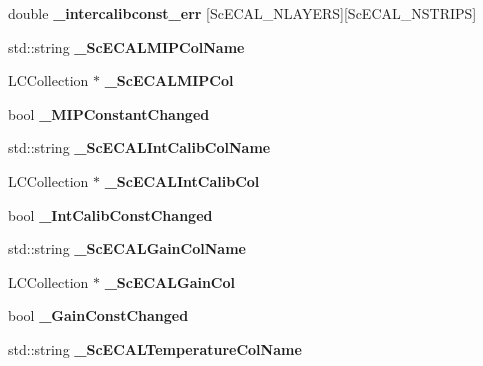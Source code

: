 \begin{DoxyCompactItemize}
\item 
double {\bfseries \-\_\-intercalibconst\-\_\-err} [Sc\-E\-C\-A\-L\-\_\-\-N\-L\-A\-Y\-E\-R\-S][Sc\-E\-C\-A\-L\-\_\-\-N\-S\-T\-R\-I\-P\-S]\label{classCALICE_1_1IntegratedScECALCalibrationProcessor_a447fee3ab3e691f7753e77849a3f5156}

\item 
std\-::string {\bfseries \-\_\-\-Sc\-E\-C\-A\-L\-M\-I\-P\-Col\-Name}\label{classCALICE_1_1IntegratedScECALCalibrationProcessor_a23fa64acf0c4c56a27cd218e45a72a95}

\item 
L\-C\-Collection $\ast$ {\bfseries \-\_\-\-Sc\-E\-C\-A\-L\-M\-I\-P\-Col}\label{classCALICE_1_1IntegratedScECALCalibrationProcessor_af9da8b814eec1d7428a50f752826816b}

\item 
bool {\bfseries \-\_\-\-M\-I\-P\-Constant\-Changed}\label{classCALICE_1_1IntegratedScECALCalibrationProcessor_a7adcc04792d1e9c91be42fffb9650ecb}

\item 
std\-::string {\bfseries \-\_\-\-Sc\-E\-C\-A\-L\-Int\-Calib\-Col\-Name}\label{classCALICE_1_1IntegratedScECALCalibrationProcessor_a06cf578e8d2e90e83423c4cda9212719}

\item 
L\-C\-Collection $\ast$ {\bfseries \-\_\-\-Sc\-E\-C\-A\-L\-Int\-Calib\-Col}\label{classCALICE_1_1IntegratedScECALCalibrationProcessor_a0ff44ca5a38c2b4b95b6f66e532c0f0f}

\item 
bool {\bfseries \-\_\-\-Int\-Calib\-Const\-Changed}\label{classCALICE_1_1IntegratedScECALCalibrationProcessor_a79ad2dea374a18735ecf63568815738e}

\item 
std\-::string {\bfseries \-\_\-\-Sc\-E\-C\-A\-L\-Gain\-Col\-Name}\label{classCALICE_1_1IntegratedScECALCalibrationProcessor_a35226bdbae7c441b3537037d5100d27c}

\item 
L\-C\-Collection $\ast$ {\bfseries \-\_\-\-Sc\-E\-C\-A\-L\-Gain\-Col}\label{classCALICE_1_1IntegratedScECALCalibrationProcessor_aafd6b24dd5fbfcf0abeeb5c887faa07a}

\item 
bool {\bfseries \-\_\-\-Gain\-Const\-Changed}\label{classCALICE_1_1IntegratedScECALCalibrationProcessor_ab7f94c6e651268e510283572be35fb5f}

\item 
std\-::string {\bfseries \-\_\-\-Sc\-E\-C\-A\-L\-Temperature\-Col\-Name}\label{classCALICE_1_1IntegratedScECALCalibrationProcessor_a3965c116379097f3dd18979b694d23e4}


\end{DoxyCompactItemize}
